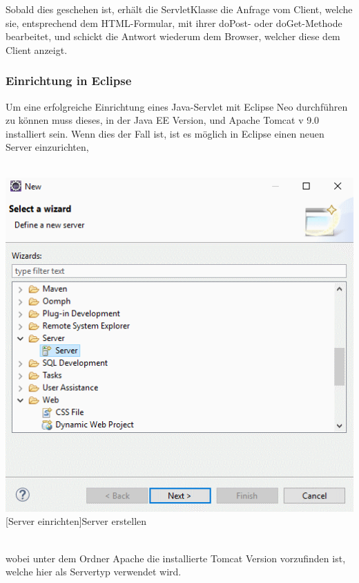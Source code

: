 \documentclass[12pt,a4paper,bibliography=totocnumbered,listof=totocnumbered]{scrartcl}
\begin{document}
Sobald dies geschehen ist, erhält die ServletKlasse die Anfrage vom Client, welche sie, entsprechend dem HTML-Formular, mit ihrer doPost- oder doGet-Methode bearbeitet, und schickt die Antwort wiederum dem Browser, welcher diese dem Client anzeigt.

\subsubsection{Einrichtung in Eclipse}
Um eine erfolgreiche Einrichtung eines Java-Servlet mit Eclipse Neo durchführen zu können muss dieses, in der Java EE Version, und Apache Tomcat v 9.0 installiert sein. 
Wenn dies der Fall ist, ist es möglich in Eclipse einen neuen Server einzurichten, \\
\\
\vspace{1em}
\begin{minipage}{\linewidth}
	\centering
	\includegraphics[width=0.7\linewidth]{Bilder/Eclipse-ServerErstellen.png}
    [Server einrichten]{Server erstellen}	
	\label{fig:eclipse1}
\end{minipage}
\\
wobei unter dem Ordner Apache die installierte Tomcat Version vorzufinden ist, welche hier  als Servertyp verwendet wird.\\
\\
\vspace{1em}
\end{document}

